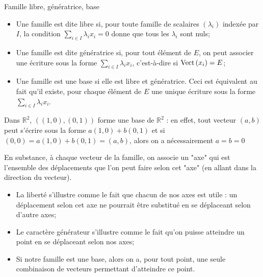 \documentclass{classe}
\begin{document}
\begin{définition}{Famille libre, génératrice, base}{}
\begin{itemize}
\item Une famille est dite libre si, pour toute famille de scalaires $(\lambda_i)$ indexée par $I$, la condition $\sum_{i\in I} \lambda_i x_i = 0$ donne que tous les $\lambda_i$ sont nuls;
\item Une famille est dite génératrice si, pour tout élément de $E$, on peut associer une écriture sous la forme $\sum_{i\in I} \lambda_i x_i$, c'est-à-dire si $\operatorname{Vect}\left( x_{i} \right) = E$;
\item Une famille est une base si elle est libre et génératrice. Ceci est équivalent au fait qu'il existe, pour chaque élément de $E$ une unique écriture sous la forme $\sum_{i\in I} \lambda_i x_i$.
\end{itemize}
\end{définition}

\begin{example}
Dans $\mathbb{R}^2$, $((1, 0),(0, 1))$ forme une base de $\mathbb{R}^2$ : en effet, tout vecteur $(a, b)$ peut s'écrire sous la forme $a(1, 0) + b(0, 1)$ et si $(0, 0) = a(1, 0) + b(0, 1) = (a, b)$, alors on a nécessairement $a=b=0$
\end{example}

En substance, à chaque vecteur de la famille, on associe un "axe" qui est l'ensemble des déplacements que l'on peut faire selon cet "axe" (en allant dans la direction du vecteur).
\begin{itemize}
	\item La liberté s'illustre comme le fait que chacun de nos axes est utile : un déplacement selon cet axe ne pourrait être substitué en se déplaceant selon d'autre axes;
	\item Le caractère générateur s'illustre comme le fait qu'on puisse atteindre un point en se déplaceant selon nos axes;
	\item Si notre famille est une base, alors on a, pour tout point, une seule combinaison de vecteurs permettant d'atteindre ce point.
\end{itemize}
\end{document}
